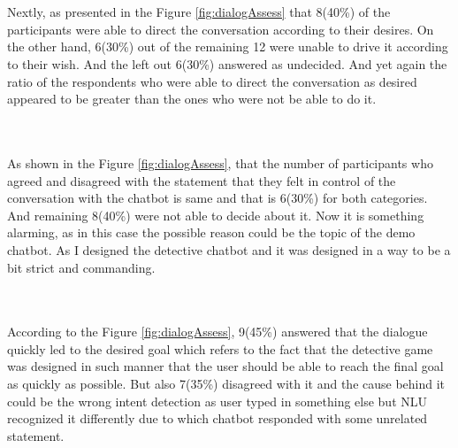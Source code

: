 \\~\\
Nextly, as presented in the Figure \ref{fig:dialogAssess} that 8(40\%) of the participants were able to direct the conversation according to their desires. On the other hand, 6(30\%) out of the remaining 12 were unable to drive it according to their wish. And the left out 6(30\%) answered as undecided. And yet again the ratio of the respondents who were able to direct the conversation as desired appeared to be greater than the ones who were not be able to do it.

\\~\\
As shown in the Figure \ref{fig:dialogAssess}, that the number of participants who agreed and disagreed with the statement that they felt in control of the conversation with the chatbot is same and that is 6(30\%) for both categories. And remaining 8(40\%) were not able to decide about it. Now it is something alarming, as in this case the possible reason could be the topic of the demo chatbot. As I designed the detective chatbot and it was designed in a way to be a bit strict and commanding. 

\\~\\
According to the Figure \ref{fig:dialogAssess}, 9(45\%) answered that the dialogue quickly led to the desired goal which refers to the fact that the detective game was designed in such manner that the user should be able to reach the final goal as quickly as possible. But also 7(35\%) disagreed with it and the cause behind it could be the wrong intent detection as user typed in something else but NLU recognized it differently due to which chatbot responded with some unrelated statement.


